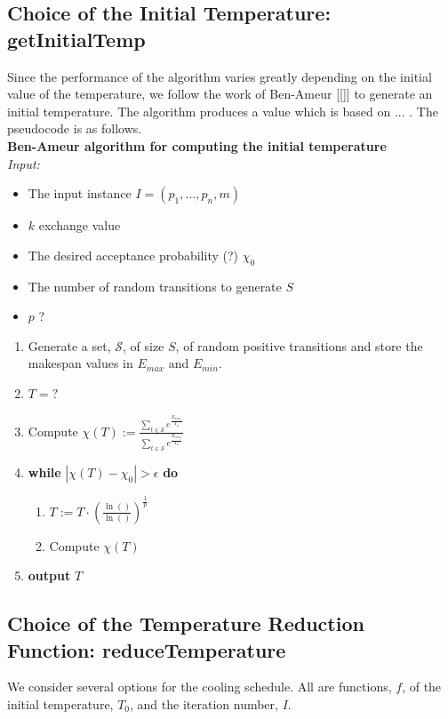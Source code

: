 \documentclass[12pt,a4paper,reqno]{article}
\begin{document}
\subsection*{Choice of the Initial Temperature: getInitialTemp}
Since the performance of the algorithm varies greatly depending on the initial value of the temperature, we follow the work of Ben-Ameur [\ref{}] to generate an initial temperature. The algorithm produces a value which is based on ... . The pseudocode is as follows.\\

\textbf{Ben-Ameur algorithm for computing the initial temperature}\\
\emph{Input:}
\begin{itemize}
  \item The input instance $I=(p_1,...,p_n,m)$
  \item $k$ exchange value
  \item The desired acceptance probability (?) $\chi_0$
  \item The number of random transitions to generate $S$
  \item $p$ ?
\end{itemize}
\begin{enumerate}
  \item Generate a set, $\mathcal{S}$, of size $S$, of random positive transitions and store the makespan values in $E_{max}$ and $E_{min}$.
  \item $T= ?$
  \item[] Compute $\chi(T):=\frac{\displaystyle\sum\limits_{t\in \mathcal{S}} e^\frac{E_{{max}_{t}}}{T_n}}{\displaystyle\sum\limits_{t\in \mathcal{S}} e^\frac{E_{{min}_{t}}}{T_n}}$
  \item \textbf{while} $|\chi(T)-\chi_0|>\epsilon$ \textbf{do}
  \begin{enumerate}
    \item $T:=T\cdot(\frac{\ln()}{\ln()})^{\frac{1}{p}}$
    \item Compute $\chi(T)$
  \end{enumerate}
  \item \textbf{output} $T$
\end{enumerate}


\subsection*{Choice of the Temperature Reduction Function: reduceTemperature}

We consider several options for the cooling schedule. All are functions, $f$, of the initial temperature, $T_0$, and the iteration number, $I$. \\
\end{document}
